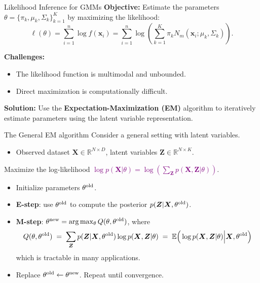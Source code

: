 \documentclass[11pt,handout,aspectratio=169]{beamer}
\begin{document}
\begin{frame}{Likelihood Inference for GMMs}
\textbf{Objective:} Estimate the parameters \( \theta = \{ \pi_k, \mu_k, \Sigma_k \}_{k=1}^K \) by maximizing the likelihood:
\[
\ell(\theta) = \sum_{i=1}^n \log f(\mathbf{x}_i) = \sum_{i=1}^n \log \left( \sum_{k=1}^K \pi_k N_m(\mathbf{x}_i; \mu_k, \Sigma_k) \right).
\]

\textbf{Challenges:}
\begin{itemize}
    \item The likelihood function is multimodal and unbounded.
    \item Direct maximization is computationally difficult.
\end{itemize}

\textbf{Solution:} Use the \textbf{Expectation-Maximization (EM)} algorithm to iteratively estimate parameters using the latent variable representation.
\end{frame}

\begin{frame}{The General EM algorithm}
Consider a general setting with latent variables.
\begin{itemize}
	\item Observed dataset $\boldsymbol{X}\in \mathbb R^{N\times D}$, latent variables $\boldsymbol{Z}\in \mathbb R^{N\times K}$.
	\end{itemize}
Maximize the log-likelihood  \textcolor{purple}{$\log p(\boldsymbol{X}|\theta)=\log\left(\sum_{\boldsymbol Z}p(\boldsymbol X,\boldsymbol Z|\theta)\right)$}.
\begin{itemize}
	\item Initialize parameters $\theta^{\rm old}$.
	 \item \textbf{E-step}: use $\theta^{\rm old}$ to compute the posterior $p(\boldsymbol{Z}|\boldsymbol{X},\theta^{\rm old})$.
 	\item \textbf{M-step}: $\theta^{\rm new}=\arg\max_\theta Q(\theta,\theta^{\rm old})$, where
$$
	Q(\theta,\theta^{\rm old})\;=\;\sum_{\boldsymbol{Z}}p(\boldsymbol{Z}|\boldsymbol{X},\theta^{\rm old})\log p(\boldsymbol{X},\boldsymbol{Z}|\theta)\;=\;\mathbb E\Big(\log p(\boldsymbol{X},\boldsymbol{Z}|\theta)\Big|\boldsymbol{X},\theta^{\rm old}\Big)
$$
which is tractable in many applications.
\item Replace $\theta^{\rm old}\leftarrow\theta^{\rm new}$. Repeat until convergence.
\end{itemize}
\end{frame}
\end{document}
